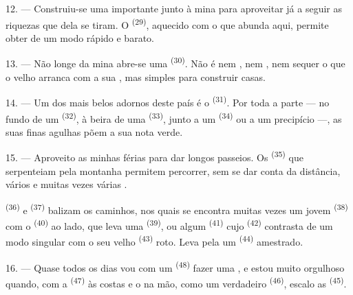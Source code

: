 12. --- Construiu-se uma importante  junto à mina para
aproveitar já a seguir as riquezas que dela se tiram. O  \textsuperscript{(29)}, aquecido com o  que abunda
aqui, permite obter  de um modo rápido e barato.

13. --- Não longe da mina abre-se uma  \textsuperscript{(30)}. Não
é nem , nem , nem sequer  o que
o velho  arranca com a sua , mas simples
 para construir casas.

14. --- Um dos mais belos adornos deste país é o 
\textsuperscript{(31)}. Por toda a parte --- no fundo de um 
\textsuperscript{(32)}, à beira de uma  \textsuperscript{(33)}, junto a
um  \textsuperscript{(34)} ou a um precipício ---, as suas finas
agulhas põem a sua nota verde.

\VUsaut{3.0mm}
\VUsaut{3.0mm}

15. --- Aproveito as minhas férias para dar longos passeios. Os
 \textsuperscript{(35)} que serpenteiam pela montanha permitem
percorrer, sem se dar conta da distância, vários  e
muitas vezes várias .

 \textsuperscript{(36)} e  \textsuperscript{(37)}
balizam os caminhos, nos quais se encontra muitas vezes um jovem
 \textsuperscript{(38)} com o 
\textsuperscript{(40)} ao lado, que leva uma  \textsuperscript{(39)}, ou
algum  \textsuperscript{(41)} cujo 
\textsuperscript{(42)} contrasta de um modo singular com o seu velho
 \textsuperscript{(43)} roto. Leva pela  um
 \textsuperscript{(44)} amestrado.

\VUsaut{3.0mm}

16. --- Quase todos os dias vou com um  \textsuperscript{(48)} fazer
uma , e estou muito orgulhoso quando, com a
 \textsuperscript{(47)} às costas e o  na
mão, como um verdadeiro  \textsuperscript{(46)}, escalo as
 \textsuperscript{(45)}.


